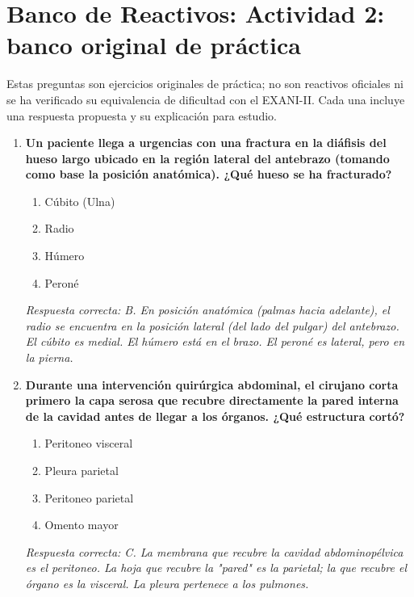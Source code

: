 \newpage
\section{Banco de Reactivos: Actividad 2: banco original de práctica}
Estas preguntas son ejercicios originales de práctica; no son reactivos oficiales ni se ha verificado su equivalencia de dificultad con el EXANI-II. Cada una incluye una respuesta propuesta y su explicación para estudio.

\begin{enumerate}[label=\textbf{\arabic*.}]
    \item \textbf{Un paciente llega a urgencias con una fractura en la diáfisis del hueso largo ubicado en la región lateral del antebrazo (tomando como base la posición anatómica). ¿Qué hueso se ha fracturado?}
    \begin{enumerate}
        \item[A)] Cúbito (Ulna)
        \item[B)] Radio
        \item[C)] Húmero
        \item[D)] Peroné
    \end{enumerate}
    \textit{Respuesta correcta: B. En posición anatómica (palmas hacia adelante), el radio se encuentra en la posición lateral (del lado del pulgar) del antebrazo. El cúbito es medial. El húmero está en el brazo. El peroné es lateral, pero en la pierna.}

    \item \textbf{Durante una intervención quirúrgica abdominal, el cirujano corta primero la capa serosa que recubre directamente la pared interna de la cavidad antes de llegar a los órganos. ¿Qué estructura cortó?}
    \begin{enumerate}
        \item[A)] Peritoneo visceral
        \item[B)] Pleura parietal
        \item[C)] Peritoneo parietal
        \item[D)] Omento mayor
    \end{enumerate}
    \textit{Respuesta correcta: C. La membrana que recubre la cavidad abdominopélvica es el peritoneo. La hoja que recubre la "pared" es la parietal; la que recubre el órgano es la visceral. La pleura pertenece a los pulmones.}


\end{enumerate}
